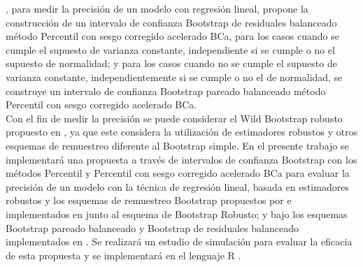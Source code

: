 \textcite{balam-2012}, para medir la precisión de un modelo con regresión lineal, propone la construcción de un intervalo de confianza Bootstrap de residuales balanceado método Percentil con sesgo corregido acelerado BCa, para los casos cuando se cumple el supuesto de varianza constante, independiente si se cumple o no el supuesto de normalidad; y para los casos cuando no se cumple el supuesto de varianza constante, independientemente si se cumple o no el de normalidad, se construye un intervalo de confianza Bootstrap pareado balanceado método Percentil con sesgo corregido acelerado BCa.\\

Con el fin de medir la precisión se puede considerar el Wild Bootstrap robusto propuesto en \textcite{rana-2012}, ya que este considera la utilización de estimadores robustos y otros esquemas de remuestreo diferente al Bootstrap simple.
En el presente trabajo se implementará una propuesta a través de intervalos de confianza Bootstrap con los métodos Percentil y Percentil con sesgo corregido acelerado BCa para evaluar la precisión de un modelo con la técnica de regresión lineal, basada en estimadores robustos y los esquemas de remuestreo Bootstrap propuestos por \textcite{rana-2012} e implementados en \textcite{zacarias-2023} junto al esquema de Bootstrap Robusto; y bajo los esquemas Bootstrap pareado balanceado y Bootstrap de residuales balanceado implementados en \textcite{balam-2012}. Se realizará un estudio de simulación para evaluar la eficacia de esta propuesta y se implementará en el lenguaje R \parencite{R-2024}.\\
